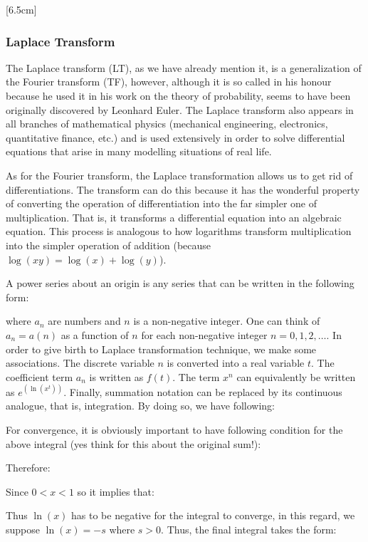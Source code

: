 	
	
	[6.5cm]
	
	\pagebreak
	\subsubsection{Laplace Transform}\label{Laplace transform}
	The Laplace transform (LT), as we have already mention it, is a generalization of the Fourier transform (TF), however, although it is so called in his honour because he used it in his work on the theory of probability, seems to have been originally discovered by Leonhard Euler. The Laplace transform also appears in all branches of mathematical physics (mechanical engineering, electronics, quantitative finance, etc.) and is used extensively in order to solve  differential equations that arise in many modelling situations of real life.
	
	As for the Fourier transform, the Laplace transformation allows us to get rid of differentiations. The transform can do this because it has the wonderful property of converting the operation of differentiation into the far simpler one of multiplication. That is, it transforms a differential equation into an algebraic equation. This process is analogous to how logarithms transform multiplication into the simpler operation of
addition (because $\log (xy)=\log(x)+\log(y)$).

	A power series about an origin is any series that can be written in the following form:
	
	where $a_n$ are  numbers and $n$ is a non-negative integer. One can think of $a_n = a(n)$ as a function of $n$ for each non-negative integer $n = 0, 1, 2, \ldots$. In order to give birth to Laplace transformation technique, we  make some associations. The discrete variable $n$ is converted into a real variable $t$. The coefficient term $a_n$ is written as $f(t)$. The term $x^n$ can equivalently be written as $e^{(\ln (x^t))}$. Finally, summation notation can be replaced by its continuous analogue, that is, integration. By doing so, we have following:
	 
For convergence, it is obviously important to have following condition for the above integral (yes think for this about the original sum!):
	 
	Therefore:
	 
	Since $0<x<1 $ so it implies that:
	
	Thus $\ln(x)$ has to be negative for the integral to converge, in this regard, we suppose $\ln(x)=-s$ where $s>0$. Thus, the final integral takes the form:
	
